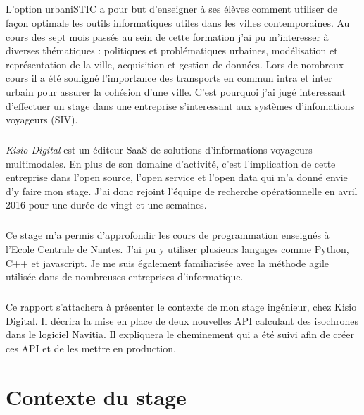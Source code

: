 \documentclass[a4paper]{report}
\begin{document}
\paragraph{} L'option urbaniSTIC a pour but d'enseigner à ses élèves comment utiliser de façon optimale les outils informatiques utiles dans les villes contemporaines. Au cours des sept mois passés au sein de cette formation j'ai pu m'interesser à diverses thématiques : politiques et problématiques urbaines, modélisation et représentation de la ville, acquisition et gestion de données. Lors de nombreux cours il a été souligné l'importance des transports en commun intra et inter urbain pour assurer la cohésion d'une ville. C'est pourquoi j'ai jugé interessant d'effectuer un stage dans une entreprise s'interessant aux systèmes d'infomations voyageurs (SIV).

\paragraph{} \emph{Kisio Digital} est un éditeur SaaS de solutions d’informations voyageurs multimodales. En plus de son domaine d'activité, c'est l'implication de cette entreprise dans l'open source, l'open service et l'open data qui m'a donné envie d'y faire mon stage. J'ai donc rejoint l'équipe de recherche opérationnelle en avril 2016 pour une durée de vingt-et-une semaines.

\paragraph{} Ce stage m'a permis d'approfondir les cours de programmation enseignés à l'Ecole Centrale de Nantes. J'ai pu y utiliser plusieurs langages comme Python, C++ et javascript. Je me suis également familiarisée avec la méthode agile utilisée dans de nombreuses entreprises d'informatique. 

\paragraph{} Ce rapport s’attachera à présenter le contexte de mon stage ingénieur, chez Kisio Digital. Il décrira la mise en place de deux nouvelles API calculant des isochrones dans le logiciel Navitia. Il expliquera le cheminement qui a été suivi afin de créer ces API et de les mettre en production.

\chapter{Contexte du stage}
\end{document}
